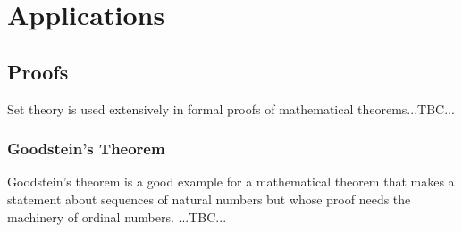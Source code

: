 




\section{Applications}

\subsection{Proofs}
Set theory is used extensively in formal proofs of mathematical theorems...TBC...

\subsubsection{Goodstein's Theorem}
Goodstein's theorem is a good example for a mathematical theorem that makes a statement about sequences of natural numbers but whose proof needs the machinery of ordinal numbers. ...TBC...


